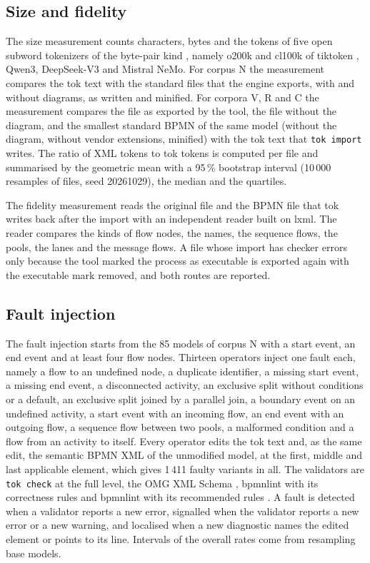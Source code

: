 \documentclass[11pt,a4paper]{article}
\begin{document}
\subsection{Size and fidelity}

The size measurement counts characters, bytes and the tokens of five open subword tokenizers of the byte-pair kind \citep{Sennrich2016}, namely o200k and cl100k of tiktoken \citep{tiktoken}, Qwen3, DeepSeek-V3 and Mistral NeMo. For corpus N the measurement compares the tok text with the standard files that the engine exports, with and without diagrams, as written and minified. For corpora V, R and C the measurement compares the file as exported by the tool, the file without the diagram, and the smallest standard BPMN of the same model (without the diagram, without vendor extensions, minified) with the tok text that \texttt{tok import} writes. The ratio of XML tokens to tok tokens is computed per file and summarised by the geometric mean with a 95\,\% bootstrap interval (10\,000 resamples of files, seed 20261029), the median and the quartiles.

The fidelity measurement reads the original file and the BPMN file that tok writes back after the import with an independent reader built on lxml. The reader compares the kinds of flow nodes, the names, the sequence flows, the pools, the lanes and the message flows. A file whose import has checker errors only because the tool marked the process as executable is exported again with the executable mark removed, and both routes are reported.

\subsection{Fault injection}

The fault injection starts from the 85 models of corpus N with a start event, an end event and at least four flow nodes. Thirteen operators inject one fault each, namely a flow to an undefined node, a duplicate identifier, a missing start event, a missing end event, a disconnected activity, an exclusive split without conditions or a default, an exclusive split joined by a parallel join, a boundary event on an undefined activity, a start event with an incoming flow, an end event with an outgoing flow, a sequence flow between two pools, a malformed condition and a flow from an activity to itself. Every operator edits the tok text and, as the same edit, the semantic BPMN XML of the unmodified model, at the first, middle and last applicable element, which gives 1\,411 faulty variants in all. The validators are \texttt{tok check} at the full level, the OMG XML Schema \citep{OMG2014BPMN}, bpmnlint with its correctness rules and bpmnlint with its recommended rules \citep{bpmnlint}. A fault is detected when a validator reports a new error, signalled when the validator reports a new error or a new warning, and localised when a new diagnostic names the edited element or points to its line. Intervals of the overall rates come from resampling base models.
\end{document}
